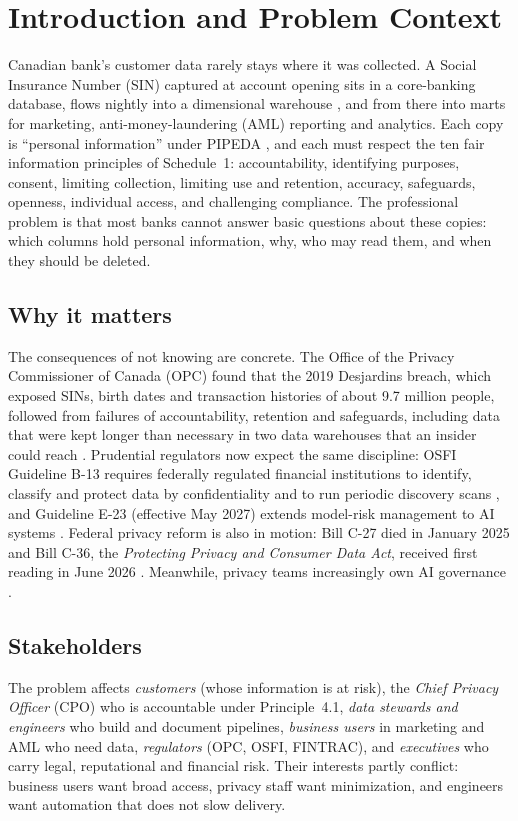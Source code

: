 \documentclass[journal,onecolumn,11pt]{IEEEtran}
\begin{document}
\section{Introduction and Problem Context}
 Canadian bank's customer data rarely stays where it was collected. A Social Insurance Number (SIN) captured at account opening sits in a core-banking database, flows nightly into a dimensional warehouse \cite{kimball}, and from there into marts for marketing, anti-money-laundering (AML) reporting and analytics. Each copy is ``personal information'' under PIPEDA \cite{pipeda}, and each must respect the ten fair information principles of Schedule~1: accountability, identifying purposes, consent, limiting collection, limiting use and retention, accuracy, safeguards, openness, individual access, and challenging compliance. The professional problem is that most banks cannot answer basic questions about these copies: which columns hold personal information, why, who may read them, and when they should be deleted.

\subsection{Why it matters}
The consequences of not knowing are concrete. The Office of the Privacy Commissioner of Canada (OPC) found that the 2019 Desjardins breach, which exposed SINs, birth dates and transaction histories of about 9.7 million people, followed from failures of accountability, retention and safeguards, including data that were kept longer than necessary in two data warehouses that an insider could reach \cite{opc_desjardins}. Prudential regulators now expect the same discipline: OSFI Guideline B-13 requires federally regulated financial institutions to identify, classify and protect data by confidentiality and to run periodic discovery scans \cite{osfi_b13}, and Guideline E-23 (effective May 2027) extends model-risk management to AI systems \cite{osfi_e23}. Federal privacy reform is also in motion: Bill C-27 died in January 2025 and Bill C-36, the \emph{Protecting Privacy and Consumer Data Act}, received first reading in June 2026 \cite{billc36}. Meanwhile, privacy teams increasingly own AI governance \cite{iapp_ai}.

\subsection{Stakeholders}
The problem affects \emph{customers} (whose information is at risk), the \emph{Chief Privacy Officer} (CPO) who is accountable under Principle~4.1, \emph{data stewards and engineers} who build and document pipelines, \emph{business users} in marketing and AML who need data, \emph{regulators} (OPC, OSFI, FINTRAC), and \emph{executives} who carry legal, reputational and financial risk. Their interests partly conflict: business users want broad access, privacy staff want minimization, and engineers want automation that does not slow delivery.
\end{document}

